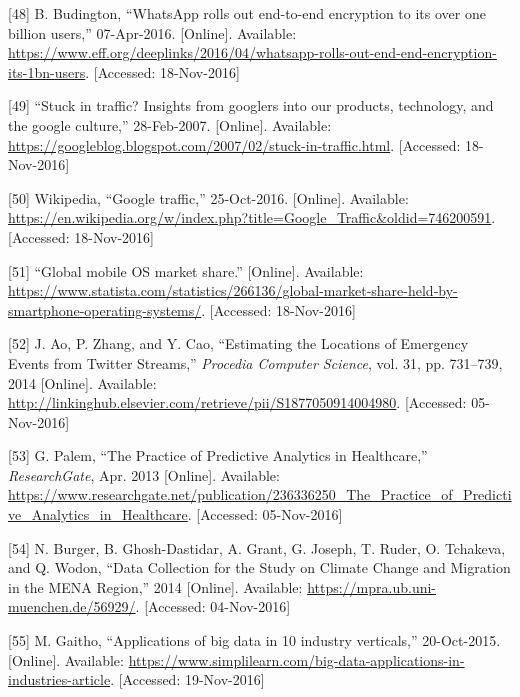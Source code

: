 \documentclass[12pt,english,a4paper,titlepage,cleardoublepage=empty,dottedtoc]{report}
\begin{document}
\hypertarget{ref-web_2016_eff_whatsapp-rolls-out-emd-to-end-encryption}{}
{[}48{]} B. Budington, ``WhatsApp rolls out end-to-end encryption to its
over one billion users,'' 07-Apr-2016. {[}Online{]}. Available:
\url{https://www.eff.org/deeplinks/2016/04/whatsapp-rolls-out-end-end-encryption-its-1bn-users}.
{[}Accessed: 18-Nov-2016{]}

\hypertarget{ref-web_2007_introducing-google-traffic}{}
{[}49{]} ``Stuck in traffic? Insights from googlers into our products,
technology, and the google culture,'' 28-Feb-2007. {[}Online{]}.
Available:
\url{https://googleblog.blogspot.com/2007/02/stuck-in-traffic.html}.
{[}Accessed: 18-Nov-2016{]}

\hypertarget{ref-web_2016_wikipedia_google-traffic}{}
{[}50{]} Wikipedia, ``Google traffic,'' 25-Oct-2016. {[}Online{]}.
Available:
\url{https://en.wikipedia.org/w/index.php?title=Google_Traffic\&oldid=746200591}.
{[}Accessed: 18-Nov-2016{]}

\hypertarget{ref-graphic_2016_global-mobile-os-market-share}{}
{[}51{]} ``Global mobile OS market share.'' {[}Online{]}. Available:
\url{https://www.statista.com/statistics/266136/global-market-share-held-by-smartphone-operating-systems/}.
{[}Accessed: 18-Nov-2016{]}

\hypertarget{ref-estimating-the-locations-of-emergency-events-from-twitter-streams_2014}{}
{[}52{]} J. Ao, P. Zhang, and Y. Cao, ``Estimating the Locations of
Emergency Events from Twitter Streams,'' \emph{Procedia Computer
Science}, vol. 31, pp. 731--739, 2014 {[}Online{]}. Available:
\url{http://linkinghub.elsevier.com/retrieve/pii/S1877050914004980}.
{[}Accessed: 05-Nov-2016{]}

\hypertarget{ref-the-practice-of-predictive-analytics-in-healthcare_2013}{}
{[}53{]} G. Palem, ``The Practice of Predictive Analytics in
Healthcare,'' \emph{ResearchGate}, Apr. 2013 {[}Online{]}. Available:
\url{https://www.researchgate.net/publication/236336250_The_Practice_of_Predictive_Analytics_in_Healthcare}.
{[}Accessed: 05-Nov-2016{]}

\hypertarget{ref-data-collection-for-climate-changes_2014}{}
{[}54{]} N. Burger, B. Ghosh-Dastidar, A. Grant, G. Joseph, T. Ruder, O.
Tchakeva, and Q. Wodon, ``Data Collection for the Study on Climate
Change and Migration in the MENA Region,'' 2014 {[}Online{]}. Available:
\url{https://mpra.ub.uni-muenchen.de/56929/}. {[}Accessed:
04-Nov-2016{]}

\hypertarget{ref-graphic_2015_applications-of-big-data-in-10-industry-verticals}{}
{[}55{]} M. Gaitho, ``Applications of big data in 10 industry
verticals,'' 20-Oct-2015. {[}Online{]}. Available:
\url{https://www.simplilearn.com/big-data-applications-in-industries-article}.
{[}Accessed: 19-Nov-2016{]}
\end{document}
